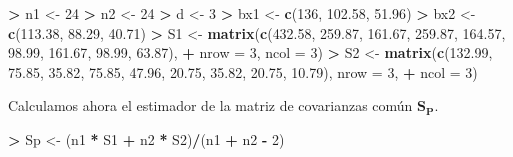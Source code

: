 \documentclass[
  a4paper,
  oneside]{scrbook}
\newenvironment{Shaded}{\begin{snugshade}}{\end{snugshade}}
\newcommand{\AttributeTok}[1]{\textcolor[rgb]{0.13,0.29,0.53}{#1}}
\newcommand{\DecValTok}[1]{\textcolor[rgb]{0.00,0.00,0.81}{#1}}
\newcommand{\FloatTok}[1]{\textcolor[rgb]{0.00,0.00,0.81}{#1}}
\newcommand{\FunctionTok}[1]{\textcolor[rgb]{0.13,0.29,0.53}{\textbf{#1}}}
\newcommand{\NormalTok}[1]{#1}
\newcommand{\OtherTok}[1]{\textcolor[rgb]{0.56,0.35,0.01}{#1}}
\newcommand{\SpecialCharTok}[1]{\textcolor[rgb]{0.81,0.36,0.00}{\textbf{#1}}}
\theoremstyle{definition}
\theoremstyle{definition}
\theoremstyle{definition}
\theoremstyle{definition}
\theoremstyle{remark}
\begin{document}
\footnotesize

\begin{Shaded}
\begin{Highlighting}[]
\SpecialCharTok{\textgreater{}}\NormalTok{ n1 }\OtherTok{\textless{}{-}} \DecValTok{24}
\SpecialCharTok{\textgreater{}}\NormalTok{ n2 }\OtherTok{\textless{}{-}} \DecValTok{24}
\SpecialCharTok{\textgreater{}}\NormalTok{ d }\OtherTok{\textless{}{-}} \DecValTok{3}
\SpecialCharTok{\textgreater{}}\NormalTok{ bx1 }\OtherTok{\textless{}{-}} \FunctionTok{c}\NormalTok{(}\DecValTok{136}\NormalTok{, }\FloatTok{102.58}\NormalTok{, }\FloatTok{51.96}\NormalTok{)}
\SpecialCharTok{\textgreater{}}\NormalTok{ bx2 }\OtherTok{\textless{}{-}} \FunctionTok{c}\NormalTok{(}\FloatTok{113.38}\NormalTok{, }\FloatTok{88.29}\NormalTok{, }\FloatTok{40.71}\NormalTok{)}
\SpecialCharTok{\textgreater{}}\NormalTok{ S1 }\OtherTok{\textless{}{-}} \FunctionTok{matrix}\NormalTok{(}\FunctionTok{c}\NormalTok{(}\FloatTok{432.58}\NormalTok{, }\FloatTok{259.87}\NormalTok{, }\FloatTok{161.67}\NormalTok{, }\FloatTok{259.87}\NormalTok{, }\FloatTok{164.57}\NormalTok{, }\FloatTok{98.99}\NormalTok{, }\FloatTok{161.67}\NormalTok{, }\FloatTok{98.99}\NormalTok{, }\FloatTok{63.87}\NormalTok{),}
\SpecialCharTok{+}     \AttributeTok{nrow =} \DecValTok{3}\NormalTok{, }\AttributeTok{ncol =} \DecValTok{3}\NormalTok{)}
\SpecialCharTok{\textgreater{}}\NormalTok{ S2 }\OtherTok{\textless{}{-}} \FunctionTok{matrix}\NormalTok{(}\FunctionTok{c}\NormalTok{(}\FloatTok{132.99}\NormalTok{, }\FloatTok{75.85}\NormalTok{, }\FloatTok{35.82}\NormalTok{, }\FloatTok{75.85}\NormalTok{, }\FloatTok{47.96}\NormalTok{, }\FloatTok{20.75}\NormalTok{, }\FloatTok{35.82}\NormalTok{, }\FloatTok{20.75}\NormalTok{, }\FloatTok{10.79}\NormalTok{), }\AttributeTok{nrow =} \DecValTok{3}\NormalTok{,}
\SpecialCharTok{+}     \AttributeTok{ncol =} \DecValTok{3}\NormalTok{)}
\end{Highlighting}
\end{Shaded}

\normalsize

Calculamos ahora el estimador de la matriz de covarianzas común
\(\bm{S_P}\).

\footnotesize

\begin{Shaded}
\begin{Highlighting}[]
\SpecialCharTok{\textgreater{}}\NormalTok{ Sp }\OtherTok{\textless{}{-}}\NormalTok{ (n1 }\SpecialCharTok{*}\NormalTok{ S1 }\SpecialCharTok{+}\NormalTok{ n2 }\SpecialCharTok{*}\NormalTok{ S2)}\SpecialCharTok{/}\NormalTok{(n1 }\SpecialCharTok{+}\NormalTok{ n2 }\SpecialCharTok{{-}} \DecValTok{2}\NormalTok{)}
\end{Highlighting}
\end{Shaded}
\end{document}
